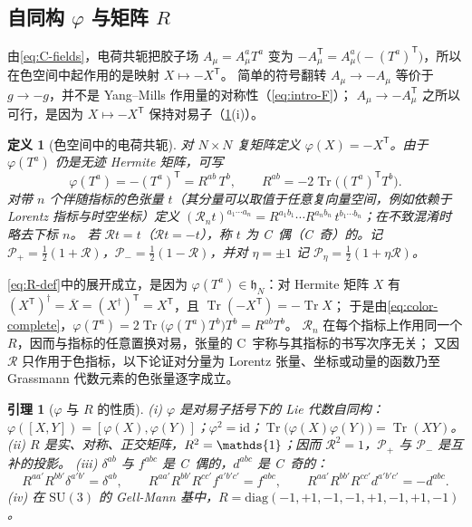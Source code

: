 \documentclass[UTF8,a4paper,11pt,fontset=fandol]{ctexart}
\let\amsmathbb\mathbb
\renewcommand{\mathbb}[1]{\ifx1#1\mathds{1}\else\amsmathbb{#1}\fi}
\theoremstyle{cplain}
\newtheorem{lemma}[theorem]{引理}
\theoremstyle{cdefinition}
\newtheorem{definition}[theorem]{定义}
\theoremstyle{cremark}
\numberwithin{equation}{section}
\DeclareMathOperator{\Tr}{Tr}
\newcommand{\tp}{\mathsf{T}}                         %
\newcommand{\Rop}{\mathcal{R}}                       %
\newcommand{\Pp}{\mathcal{P}_{+}}                    %
\newcommand{\Pm}{\mathcal{P}_{-}}                    %
\begin{document}
\subsection{自同构 \texorpdfstring{$\varphi$}{φ} 与矩阵 \texorpdfstring{$R$}{R}}\label{sec:color-phi}

由\cref{eq:C-fields}，电荷共轭把胶子场 $A_\mu=A_\mu^aT^a$ 变为 $-A_\mu^{\tp}=A^a_\mu\bigl(-(T^a)^{\tp}\bigr)$，所以在色空间中起作用的是映射 $X\mapsto-X^{\tp}$。
简单的符号翻转 $A_\mu\to-A_\mu$ 等价于 $g\to-g$，并不是 Yang--Mills 作用量的对称性（\cref{eq:intro-F}）；
$A_\mu\to-A_\mu^{\tp}$ 之所以可行，是因为 $X\mapsto-X^{\tp}$ 保持对易子（\cref{lem:R-properties}(i)）。

\begin{definition}[色空间中的电荷共轭]\label{def:phi-R}
对 $N\times N$ 复矩阵定义 $\varphi(X)=-X^{\tp}$。由于 $\varphi(T^a)$ 仍是无迹 Hermite 矩阵，可写
\begin{equation}\label{eq:R-def}
\varphi(T^a)=-(T^a)^{\tp}=R^{ab}\,T^b,\qquad R^{ab}=-2\Tr\bigl((T^a)^{\tp}T^b\bigr).
\end{equation}
对带 $n$ 个伴随指标的色张量 $t$（其分量可以取值于任意复向量空间，例如依赖于 Lorentz 指标与时空坐标）定义
$(\Rop_n t)^{a_1\cdots a_n}=R^{a_1b_1}\cdots R^{a_nb_n}\,t^{b_1\cdots b_n}$；在不致混淆时略去下标 $n$。
若 $\Rop t=t$（$\Rop t=-t$），称 $t$ 为 C~偶（C~奇）的。记 $\Pp=\tfrac12(1+\Rop)$，$\Pm=\tfrac12(1-\Rop)$，并对 $\eta=\pm1$ 记 $\mathcal P_\eta=\tfrac12(1+\eta\Rop)$。
\end{definition}

\cref{eq:R-def}中的展开成立，是因为 $\varphi(T^a)\in\mathfrak h_N$：对 Hermite 矩阵 $X$ 有 $(X^{\tp})^\dagger=\overline X=(X^\dagger)^{\tp}=X^{\tp}$，且 $\Tr(-X^{\tp})=-\Tr X$；
于是由\cref{eq:color-complete}，$\varphi(T^a)=2\Tr\bigl(\varphi(T^a)T^b\bigr)T^b=R^{ab}T^b$。
$\Rop_n$ 在每个指标上作用同一个 $R$，因而与指标的任意置换对易，张量的 C~宇称与其指标的书写次序无关；
又因 $\Rop$ 只作用于色指标，以下论证对分量为 Lorentz 张量、坐标或动量的函数乃至 Grassmann 代数元素的色张量逐字成立。

\begin{lemma}[$\varphi$ 与 $R$ 的性质]\label{lem:R-properties}
(i) $\varphi$ 是对易子括号下的 Lie 代数自同构：$\varphi([X,Y])=[\varphi(X),\varphi(Y)]$；$\varphi^2=\mathrm{id}$；$\Tr\bigl(\varphi(X)\varphi(Y)\bigr)=\Tr(XY)$。
(ii) $R$ 是实、对称、正交矩阵，$R^2=\mathbb 1$；因而 $\Rop^2=1$，$\Pp$ 与 $\Pm$ 是互补的投影。
(iii) $\delta^{ab}$ 与 $f^{abc}$ 是 C~偶的，$d^{abc}$ 是 C~奇的：
\begin{equation}\label{eq:f-even-d-odd}
R^{aa'}R^{bb'}\delta^{a'b'}=\delta^{ab},\qquad
R^{aa'}R^{bb'}R^{cc'}f^{a'b'c'}=f^{abc},\qquad
R^{aa'}R^{bb'}R^{cc'}d^{a'b'c'}=-d^{abc}.
\end{equation}
(iv) 在 $\mathrm{SU}(3)$ 的 Gell-Mann 基中，$R=\mathrm{diag}(-1,+1,-1,-1,+1,-1,+1,-1)$。
\end{lemma}
\end{document}
